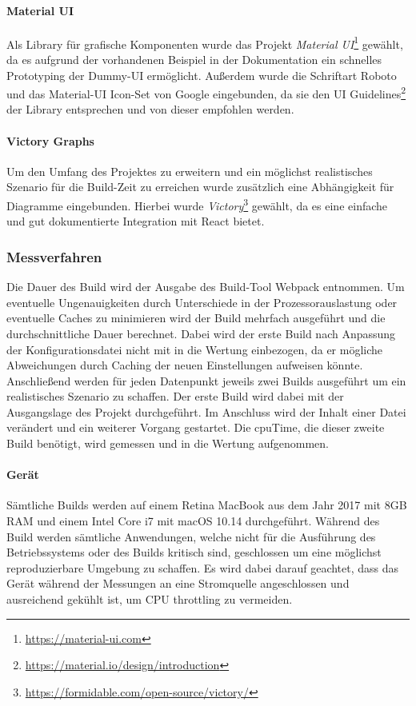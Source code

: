 \documentclass[11pt]{article}
\begin{document}
				\paragraph{Material UI} Als Library für grafische Komponenten wurde das Projekt \emph{Material UI}\footnote{\url{https://material-ui.com}} gewählt, da es aufgrund der vorhandenen Beispiel in der Dokumentation ein schnelles Prototyping der Dummy-UI ermöglicht. Außerdem wurde die Schriftart Roboto und das Material-UI Icon-Set von Google eingebunden, da sie den UI Guidelines\footnote{\url{https://material.io/design/introduction}} der Library entsprechen und von dieser empfohlen werden.
				
				\paragraph{Victory Graphs} Um den Umfang des Projektes zu erweitern und ein möglichst realistisches Szenario für die Build-Zeit zu erreichen wurde zusätzlich eine Abhängigkeit für Diagramme eingebunden. Hierbei wurde \emph{Victory}\footnote{\url{https://formidable.com/open-source/victory/}} gewählt, da es eine einfache und gut dokumentierte Integration mit React bietet.
				
			\subsubsection{Messverfahren}
				Die Dauer des Build wird der Ausgabe des Build-Tool Webpack entnommen. Um eventuelle Ungenauigkeiten durch Unterschiede in der Prozessorauslastung oder eventuelle Caches zu minimieren wird der Build mehrfach ausgeführt und die durchschnittliche Dauer berechnet. Dabei wird der erste Build nach Anpassung der Konfigurationsdatei nicht mit in die Wertung einbezogen, da er mögliche Abweichungen durch Caching der neuen Einstellungen aufweisen könnte. Anschließend werden für jeden Datenpunkt jeweils zwei Builds ausgeführt um ein realistisches Szenario zu schaffen. Der erste Build wird dabei mit der Ausgangslage des Projekt durchgeführt. Im Anschluss wird der Inhalt einer Datei verändert und ein weiterer Vorgang gestartet. Die \Gls{cpuTime}, die dieser zweite Build benötigt, wird gemessen und in die Wertung aufgenommen.
	            
				\paragraph{Gerät} Sämtliche Builds werden auf einem Retina MacBook aus dem Jahr 2017 mit 8GB RAM und einem Intel Core i7 mit macOS 10.14 durchgeführt. Während des Build werden sämtliche Anwendungen, welche nicht für die Ausführung des Betriebssystems oder des Builds kritisch sind, geschlossen um eine möglichst reproduzierbare Umgebung zu schaffen. Es wird dabei darauf geachtet, dass das Gerät während der Messungen an eine Stromquelle angeschlossen und ausreichend gekühlt ist, um CPU throttling zu vermeiden.
				
\end{document}

